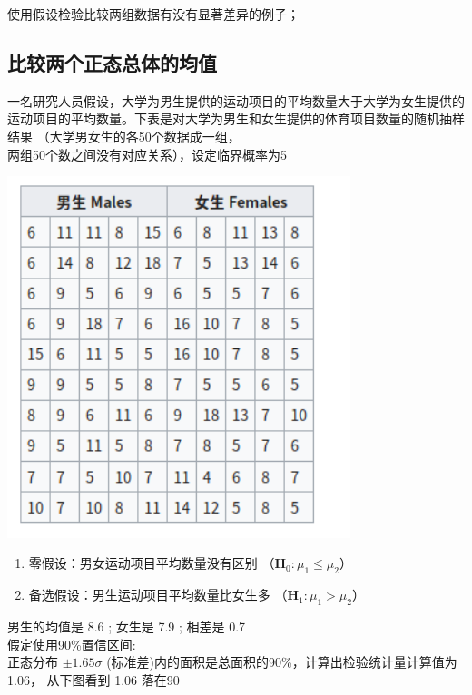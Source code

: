 使用假设检验比较两组数据有没有显著差异的例子；

\hypertarget{ux6bd4ux8f83ux4e24ux4e2aux6b63ux6001ux603bux4f53ux7684ux5747ux503c}{%
\subsection{比较两个正态总体的均值}\label{ux6bd4ux8f83ux4e24ux4e2aux6b63ux6001ux603bux4f53ux7684ux5747ux503c}}

一名研究人员假设，大学为男生提供的运动项目的平均数量大于大学为女生提供的运动项目的平均数量。下表是对大学为男生和女生提供的体育项目数量的随机抽样结果 （大学男女生的各50个数据成一组，\\

两组50个数之间没有对应关系），设定临界概率为5%



\includegraphics[width=10cm]{Screenshotfrom2022-12-2822-35-57.png}


\begin{enumerate}
\tightlist
\item
  零假设：男女运动项目平均数量没有区别
  （\(\mathbf{H}_0: {\mu}_1 \le  {\mu}_2\)）
\item
  备选假设：男生运动项目平均数量比女生多
  （\(\mathbf{H}_1: {\mu}_1 > {\mu}_2\)）
\end{enumerate}

男生的均值是 8.6 ; 女生是 7.9 ; 相差是 0.7\\
假定使用90\%置信区间:\\
正态分布 \(\pm 1.65{\sigma}\) (标准差)内的面积是总面积的90\%，计算出检验统计量计算值为1.06， 从下图看到 1.06 落在90%

